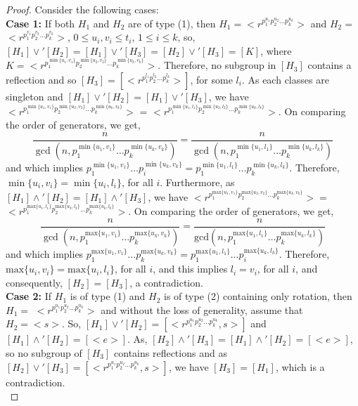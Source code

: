 \documentclass{article}
\theoremstyle{definition}
\begin{document}
\begin{proof}
Consider the following cases: \vspace{0.2cm} \\
\textbf{Case 1:} If both $H_1$ and $H_2$ are of type (1), then $H_1=\bigl<r^{p_1^{u_1}p_2^{u_2}\dots p_k^{u_k}}\bigr>$ and $H_2=$ $\bigl <r^{p_1^{v_1}p_2^{v_2}\dots p_k^{v_k}}\bigr>$, $0\le u_i,v_i\le t_i$, $1\le i\le k$, so, $[H_1]\vee' [H_2]=[H_1]\vee' [H_3]=[H_2]\vee'[H_3]=[K]$, where $K=\bigl<r^{p_1^{\min\{u_1,v_1\}}p_2^{\min\{u_2,v_2\}}\dots p_k^{\min\{u_k,v_k\}}}\bigr> $. Therefore, no subgroup in $[H_3]$ contains a reflection and so $[H_3]=[\bigl<r^{p_1^{l_1}p_2^{l_2}\dots p_k^{l_k}}\bigr>]$, for some $l_i$. As each classes are singleton and $[H_1]\vee' [H_2]=[H_1]\vee' [H_3]$, we have $\bigl<r^{p_1^{\min\{u_1,v_1\}}p_2^{\min\{u_2,v_2\}}\dots p_k^{\min\{u_k,v_k\}}}\bigr>$ = $\bigl<r^{p_1^{\min\{u_1,l_1\}}p_2^{\min\{u_2,l_2\}}\dots p_k^{\min\{u_k,l_k\}}}\bigr>$. On comparing the order of generators, we get, 
\begin{equation*}
\frac{n}{\gcd(n, p_1^{\min\{u_1,v_1\}}\dots p_k^{\min\{u_k,v_k\}})}=    \frac{n}{\gcd(n, p_1^{\min\{u_1,l_1\}}\dots p_k^{\min\{u_k,l_k\}}   )}
\end{equation*}
and which implies $p_1^{\min\{u_1,v_1\}}\dots p_i^{\min\{u_k,v_k\}}=p_1^{\min\{u_1,l_1\}}\dots p_k^{\min\{u_k,l_k\}}$. Therefore, $\min\{u_i,v_i\}=\min\{u_i,l_i\}$, for all $i$. Furthermore, as $[H_1]\wedge' [H_2]=[H_1]\wedge'[H_3]$, we have $\bigl<r^{p_1^{\text{max}\{u_1,v_1\}}p_2^{\text{max}\{u_2,v_2\}}\dots p_k^{\text{max}\{u_k,v_k\}}}\bigr>=  $ $ \bigl<r^{p_1^{\text{max}\{u_1,l_1\}}p_2^{\text{max}\{u_2,l_2\}}\dots p_k^{\text{max}\{u_k,l_k\}}}\bigr>$. On comparing the order of generators, we get,
\begin{equation*}
\frac{n}{\gcd(n, p_1^{\text{max}\{u_1,v_1\}}\dots p_k^{\text{max}\{u_k,v_k\}}   )}=\frac{n}{\text{gcd}(n, p_1^{\text{max}\{u_1,l_1\}}\dots p_k^{\text{max}\{u_k,l_k\}})}
\end{equation*}
and which implies $p_1^{\text{max}\{u_1,v_1\}}\dots p_k^{\text{max}\{u_k,v_k\}}=p_1^{\text{max}\{u_1,l_1\}}\dots p_i^{\text{max}\{u_k,l_k\}}$. Therefore, $\text{max}\{u_i,v_i\}=\text{max}\{u_i,l_i\}$, for all $i$, and this implies $l_i=v_i$, for all $i$, and consequently, $[H_2]=[H_3]$, a contradiction.\vspace{0.2cm}\\
\textbf{Case 2:} If $H_1$ is of type (1) and $H_2$ is of type (2) containing only rotation, then $H_1=$ $\bigl<r^{p_1^{u_1}p_2^{u_2}\dots p_k^{u_k}}\bigr>$ and without the loss of generality, assume that $H_2=\bigl<s\bigr>$. So, $[H_1]\vee'[H_2]=[\bigl<r^{p_1^{u_1}p_2^{u_2}\dots p_k^{u_k}},s\bigr> ]$ and $[H_1]\wedge' [H_2]=[\bigl<e\bigr>]$. As, $[H_2]\wedge' [H_3]=[H_1]\wedge' [H_2]=[\bigl<e\bigr>]$, so no subgroup of $[H_3]$ contains reflections and as $[H_2]\vee' [H_3]=[\bigl<r^{p_1^{u_1}p_2^{u_2}\dots p_k^{u_k}},s\bigr> ] $, we have $[H_3]=[H_1]$, which is a contradiction. \vspace{0.2cm}\\

\end{proof}
\end{document}
